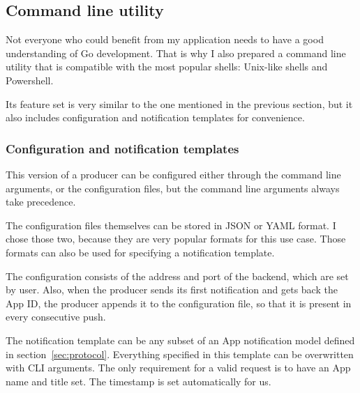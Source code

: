 \subsection{Command line utility}\label{sec:command-line-utility}

Not everyone who could benefit
from my application
needs to have a good understanding
of Go development.
That is why I also prepared
a command line utility
that is compatible with the most popular shells:
Unix-like shells and Powershell.

Its feature set is very similar
to the one mentioned in the previous section,
but it also includes configuration
and notification templates
for convenience.

\subsubsection{Configuration and notification templates}\label{sec:configuration-and-notification-templates}

This version of a producer can be configured
either through the command line arguments,
or the configuration files,
but the command line arguments
always take precedence.

The configuration files themselves
can be stored in JSON or YAML format.
I chose those two,
because they are very popular formats
for this use case.
Those formats can also be used
for specifying a notification template.

The configuration consists of
the address and port of the backend,
which are set by user.
Also, when the producer sends its first notification
and gets back the App ID,
the producer appends it to the configuration file,
so that it is present in every consecutive push.

The notification template can be any
subset of an App notification model
defined in section~\ref{sec:protocol}.
Everything specified in this template
can be overwritten with CLI arguments.
The only requirement for a valid request
is to have an App name and title set.
The timestamp is set automatically for us.
